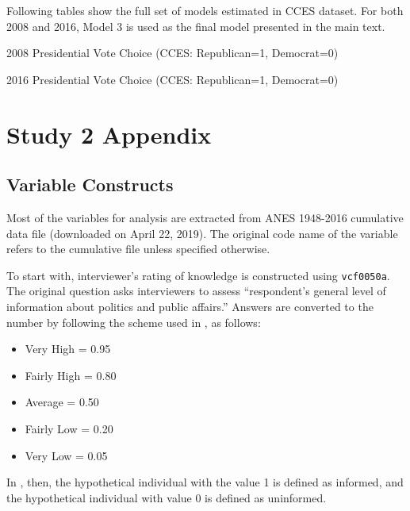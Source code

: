\par Following tables show the full set of models estimated in CCES dataset. For both 2008 and 2016, Model 3 is used as the final model presented in the main text.

\begin{table}[ht!!!]
    \footnotesize
    \centering
    \caption{2008 Presidential Vote Choice (CCES: Republican=1, Democrat=0)}
    
\end{table}

\begin{table}[ht!!!]
    \footnotesize
    \centering
    \caption{2016 Presidential Vote Choice (CCES: Republican=1, Democrat=0)}
    
\end{table}

\clearpage

\section{Study 2 Appendix} \label{appB}
\setcounter{table}{0}
\renewcommand{\thetable}{B\arabic{table}}
\setcounter{figure}{0}
\renewcommand{\thefigure}{B\arabic{figure}}

\subsection{Variable Constructs}

\par Most of the variables for analysis are extracted from ANES 1948-2016 cumulative data file (downloaded on April 22, 2019). The original code name of the variable refers to the cumulative file unless specified otherwise. 

\par To start with, interviewer's rating of knowledge is constructed using \texttt{vcf0050a}. The original question asks interviewers to assess ``respondent's general level of information about politics and public affairs.'' Answers are converted to the number by following the scheme used in \cite{Bartels1996unvo}, as follows:
\begin{itemize}
    \item Very High = 0.95
    \item Fairly High = 0.80
    \item Average = 0.50
    \item Fairly Low = 0.20
    \item Very Low = 0.05
\end{itemize}    
\noindent In \cite{Bartels1996unvo}, then, the hypothetical individual with the value 1 is defined as informed, and the hypothetical individual with value 0 is defined as uninformed.


